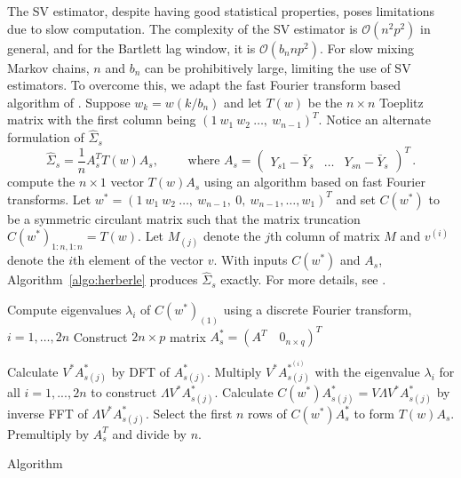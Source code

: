\documentclass[11pt]{article}
\theoremstyle{remark}
\begin{document}
The SV estimator, despite having good statistical properties, poses limitations due to slow computation. The complexity of the SV estimator is $\mathcal{O}(n^2 p^2)$ in general, and for the Bartlett lag window, it is $\mathcal{O}(b_n n p^2)$. For slow mixing Markov chains, $n$ and $b_n$ can be prohibitively large, limiting the use of SV estimators.  To overcome this, we adapt the  fast Fourier transform based algorithm of \cite{heberle2017fast}. Suppose $w_k = w(k/b_n)$ and let $T(w)$ be the $n \times n$ Toeplitz matrix with the first column being $(1 ~ w_1 ~ w_2 ~ \dots, ~ w_{n-1})^T$. Notice an alternate formulation of $\hat{\Sigma}_s$
%
\begin{equation} \label{eq:kyriakoulis}
    \hat{\Sigma}_s = \dfrac{1}{n}A_s^T T(w) A_s, \qquad \textrm{ where } A_s = \begin{pmatrix}
    Y_{s1} - \bar{Y}_s  & \dots & Y_{sn} - \bar{Y}_s
\end{pmatrix}^T \,.
\end{equation}
 \cite{heberle2017fast} compute the $n \times 1$ vector $T(w)A_s$  using an algorithm based on fast Fourier transforms. Let $w^* = (1 ~ w_1 ~ w_2 ~ \dots, ~ w_{n-1}, ~0, ~w_{n-1}, \dots, w_1)^T$ and set $C(w^*)$ to be a symmetric circulant matrix such that the matrix truncation $C(w^*)_{1:n, 1:n} = T(w)$. Let $M_{(j)}$ denote the $j$th column of matrix $M$ and $v^{(i)}$ denote the $i$th element of the vector $v$. With inputs $C(w^*)$ and $A_s$, Algorithm~\ref{algo:herberle} produces $\hat{\Sigma}_s$ exactly. For more details, see \cite{heberle2017fast}.


\begin{algorithm}[htbp] 
\DontPrintSemicolon
\SetAlgoLined
Compute eigenvalues $\lambda_i$ of  $C(w^*)_{(1)}$ using a discrete Fourier transform, $i = 1, \dots, 2n$\;
Construct $2n \times p$ matrix $A^*_s = (A^T  \quad 0_{n \times q})^T$\;

    { 
    Calculate $V^*A^*_{s(j)}$ by DFT of $A^*_{s(j)}$.\;
    Multiply $V^* A_{s(j)}^{*^{(i)}}$ with the eigenvalue $\lambda_i$ for all $i = 1, ..., 2n$ to construct $\Lambda V^* A_{s(j)}^*$.\;
    Calculate $C(w^*)A^*_{s(j)} = V \Lambda V^* A_{s(j)}^*$ by inverse FFT of $\Lambda V^* A_{s(j)}^*$.\;
    }
 Select the first $n$ rows of $C(w^*)A^*_s$ to form $T(w)A_s$.\;
 Premultiply by $A_s^T$ and divide by $n$.\;
 \caption{\cite{heberle2017fast} Algorithm}
 \label{algo:herberle}
\end{algorithm}
\end{document}
